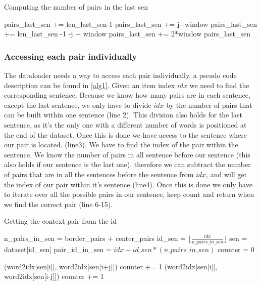 \begin{algorithm}[h]
\caption{Computing the number of pairs in the last sen}
\label{alg2}
\begin{algorithmic}[1]
\STATE pairs\_last\_sen += len\_last\_sen-1
\ELSE
\STATE pairs\_last\_sen += j+window
\ENDIF
{}
\STATE pairs\_last\_sen += len\_last\_sen -1 -j + window
\ELSE
\STATE pairs\_last\_sen += 2*window
\ENDIF
\ENDFOR
\RETURN pairs\_last\_sen
\end{algorithmic}
\end{algorithm}

 \subsubsection{Accessing each pair individually}
The dataloader needs a way to access each pair individually, a pseudo code description can be found in \ref{alg1}. 
Given an item index $idx$ we need to find the corresponding sentence. Because we know how many pairs  are in each sentence, except the last sentence, we only have to divide $idx$ by the number of pairs that can be built within one sentence (line 2). This division also holds for the last sentence, as it's the only one with a different number of words is positioned at the end of the dataset. Once this is done we have access to the sentence where our pair is located. (line3). We have to find the index of the pair within the sentence. We know the number of pairs in all sentence before our sentence (this also holds if our sentence is the last one), therefore we can subtract the number of pairs that are in all the sentences before the sentence from $idx$, and will get the index of our pair within it's sentence (line4). Once this is done we only have to iterate over all the possible pairs in our sentence, keep count and return when we find the correct pair (line 6-15).
\begin{algorithm}
\caption{Getting the context pair from the id}
\label{alg1}
\begin{algorithmic}[1]

\STATE n\_pairs\_in\_sen = border\_pairs + center\_pairs
 \STATE id\_sen = $\lfloor \frac{idx}{n\_pairs\_in\_sen} \rfloor$
\STATE  sen  = dataset[id\_sen]
\STATE  pair\_id\_in\_sen = $idx - id\_sen*(n\_pairs\_in\_sen)$
\STATE counter = 0

\RETURN (word2idx[sen[i]], word2idx[sen[i+j]])
\ENDIF
\STATE counter += 1
\ENDIF
{}
\RETURN (word2idx[sen[i]], word2idx[sen[i-j]])
\ENDIF
\STATE counter += 1
\ENDIF
\ENDFOR
\ENDFOR
\end{algorithmic}
\end{algorithm}

